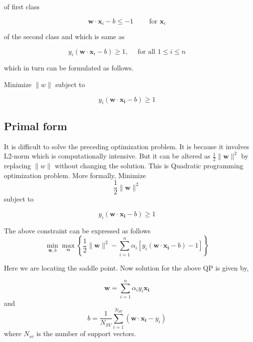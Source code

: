 of first class

\begin{equation}
\mathbf{w}\cdot\mathbf{x}_i - b \le -1\qquad\text{ for }\mathbf{x}_i 
\end{equation}

of the second class and which is same as 

\begin{equation}
    y_i(\mathbf{w}\cdot\mathbf{x}_i - b) \ge 1, \quad \text{ for all } 1 \le i \le n
\end{equation}

which in turn can be formulated as follows.

Minimize $\|w\|$ subject to 

\begin{equation}
    y_i(\mathbf{w}\cdot\mathbf{x_i} - b) \ge 1
\end{equation}


\subsection{Primal form}
It is difficult to solve the preceding optimization problem. It is because it involves L2-norm which 
is computationally intensive. But it can be altered as $\frac{1}{2}\|\mathbf{w}\|^2$ by replacing $\|w\|$
without changing the solution. This is Quadratic programming optimization problem. More formally,
Minimize 
\begin{equation}
    \frac{1}{2}\|\mathbf{w}\|^2 
\end{equation}
subject to

\begin{equation}
    y_i(\mathbf{w}\cdot\mathbf{x_i} - b) \ge 1
    \end{equation}
    
The above constraint can be expressed as follows
\begin{equation}
    \min_{\mathbf{w},b } \max_{\boldsymbol{\alpha} } \left\{ \frac{1}{2}\|\mathbf{w}\|^2 - \sum_{i=1}^{n}{\alpha_i[y_i(\mathbf{w}\cdot \mathbf{x_i} - b)-1]} \right\} 
    \end{equation}
    
    Here we are locating the saddle point. Now solution for the above QP is given by, 
    
\begin{equation}
\mathbf{w} = \sum_{i=1}^n{\alpha_i y_i\mathbf{x_i}} 
\end{equation}
and 
\begin{equation}
    b = \frac{1}{N_{SV}} \sum_{i=1}^{N_{SV}}{(\mathbf{w}\cdot\mathbf{x_i} - y_i)} 
\end{equation}
where $N_{sv}$ is the number of support vectors.

